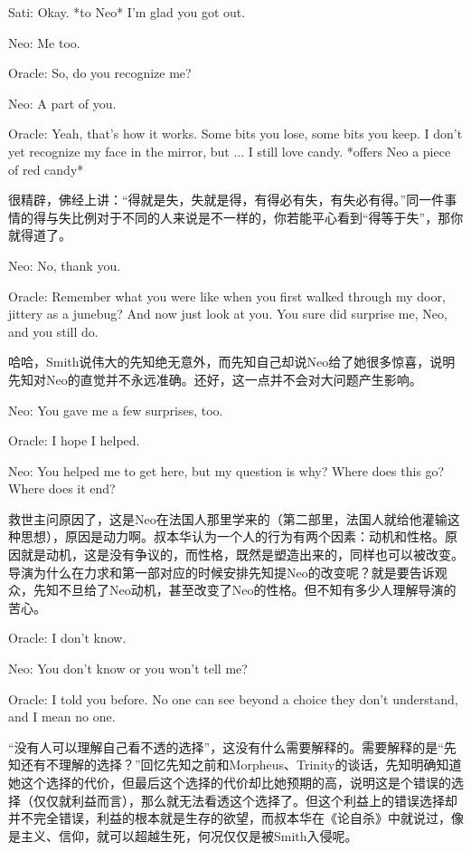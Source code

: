 \documentclass[UTF8]{ctexart}
\newenvironment{myquote}{\color{green} \setlength{\leftskip}{6em} \setlength{\rightskip}{4em} \setlength{\parindent}{-2em}}{\par}
\begin{document}
\begin{myquote}
Sati: Okay. *to Neo* I'm glad you got out.

Neo: Me too.

Oracle: So, do you recognize me?

Neo: A part of you.

Oracle: Yeah, that's how it works. Some bits you lose, some bits you keep. I don't yet recognize my face in the mirror, but ... I still love candy. *offers Neo a piece of red candy*
\end{myquote}

很精辟，佛经上讲：“得就是失，失就是得，有得必有失，有失必有得。”同一件事情的得与失比例对于不同的人来说是不一样的，你若能平心看到“得等于失”，那你就得道了。

\begin{myquote}
Neo: No, thank you.

Oracle: Remember what you were like when you first walked through my door, jittery as a junebug? And now just look at you. You sure did surprise me, Neo, and you still do.
\end{myquote}

哈哈，Smith说伟大的先知绝无意外，而先知自己却说Neo给了她很多惊喜，说明先知对Neo的直觉并不永远准确。还好，这一点并不会对大问题产生影响。

\begin{myquote}
Neo: You gave me a few surprises, too.

Oracle: I hope I helped.

Neo: You helped me to get here, but my question is why? Where does this go? Where does it end?
\end{myquote}

救世主问原因了，这是Neo在法国人那里学来的（第二部里，法国人就给他灌输这种思想），原因是动力啊。叔本华认为一个人的行为有两个因素：动机和性格。原因就是动机，这是没有争议的，而性格，既然是塑造出来的，同样也可以被改变。导演为什么在力求和第一部对应的时候安排先知提Neo的改变呢？就是要告诉观众，先知不旦给了Neo动机，甚至改变了Neo的性格。但不知有多少人理解导演的苦心。

\begin{myquote}
Oracle: I don't know.

Neo: You don't know or you won't tell me?

Oracle: I told you before. No one can see beyond a choice they don't understand, and I mean no one.
\end{myquote}

“没有人可以理解自己看不透的选择”，这没有什么需要解释的。需要解释的是“先知还有不理解的选择？”回忆先知之前和Morpheus、Trinity的谈话，先知明确知道她这个选择的代价，但最后这个选择的代价却比她预期的高，说明这是个错误的选择（仅仅就利益而言），那么就无法看透这个选择了。但这个利益上的错误选择却并不完全错误，利益的根本就是生存的欲望，而叔本华在《论自杀》中就说过，像是主义、信仰，就可以超越生死，何况仅仅是被Smith入侵呢。
\end{document}

